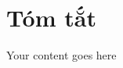 \documentclass[../main.tex]{subfiles}
\begin{document}
	\chapter*{Tóm tắt}

	\justifying

	Your content goes here

	\newpage

\end{document}

